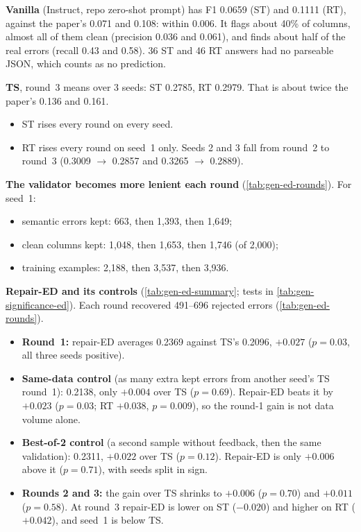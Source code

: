 \begin{observation}
\textbf{Vanilla} (Instruct, repo zero-shot prompt) has F1 0.0659 (ST) and 0.1111 (RT), against the paper's 0.071 and
0.108: within 0.006. It flags about 40\% of columns, almost all of them clean (precision 0.036 and 0.061),
and finds about half of the real errors (recall 0.43 and 0.58). 36 ST and 46 RT answers had no parseable JSON, which
counts as no prediction.

\textbf{TS}, round~3 means over 3 seeds: ST 0.2785, RT 0.2979. That is about twice the paper's
0.136 and 0.161.
\begin{itemize}
\item ST rises every round on every seed.
\item RT rises every round on seed~1 only. Seeds 2 and 3 fall from round~2 to round~3 (0.3009 $\to$ 0.2857 and 0.3265
$\to$ 0.2889).
\end{itemize}

\textbf{The validator becomes more lenient each round} (\cref{tab:gen-ed-rounds}). For seed~1:
\begin{itemize}
\item semantic errors kept: 663, then 1,393, then 1,649;
\item clean columns kept: 1,048, then 1,653, then 1,746 (of 2,000);
\item training examples: 2,188, then 3,537, then 3,936.
\end{itemize}
\end{observation}

\begin{observation}
\textbf{Repair-ED and its controls} (\cref{tab:gen-ed-summary}; tests in \cref{tab:gen-significance-ed}). Each round
recovered 491--696 rejected errors (\cref{tab:gen-ed-rounds}).
\begin{itemize}
\item \textbf{Round~1:} repair-ED averages 0.2369 against TS's 0.2096, $+0.027$ ($p=0.03$, all three seeds positive).
\item \textbf{Same-data control} (as many extra kept errors from another seed's TS round~1): 0.2138, only $+0.004$ over
TS ($p=0.69$). Repair-ED beats it by $+0.023$ ($p=0.03$; RT $+0.038$, $p=0.009$), so the round-1 gain is not data
volume alone.
\item \textbf{Best-of-2 control} (a second sample without feedback, then the same validation): 0.2311, $+0.022$ over TS
($p=0.12$). Repair-ED is only $+0.006$ above it ($p=0.71$), with seeds split in sign.
\item \textbf{Rounds 2 and 3:} the gain over TS shrinks to $+0.006$ ($p=0.70$) and $+0.011$ ($p=0.58$). At round~3
repair-ED is lower on ST ($-0.020$) and higher on RT ($+0.042$), and seed~1 is below TS.
\end{itemize}
\end{observation}

